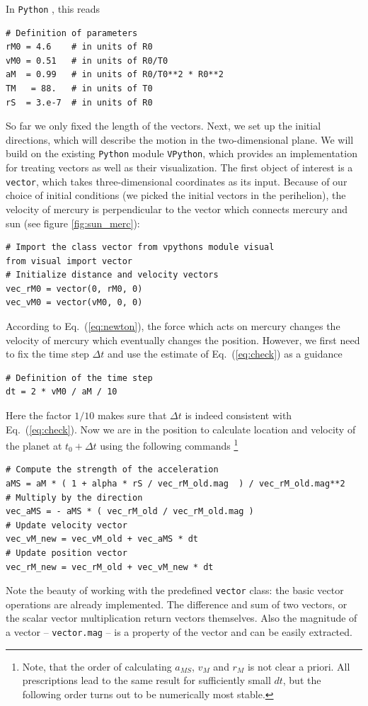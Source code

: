 \documentclass[12pt]{iopart}
\newcommand{\python}[0]{\texttt{Python} }
\begin{document}
In \python, this reads
\begin{lstlisting}
# Definition of parameters
rM0 = 4.6    # in units of R0
vM0 = 0.51   # in units of R0/T0
aM  = 0.99   # in units of R0/T0**2 * R0**2
TM   = 88.   # in units of T0
rS  = 3.e-7  # in units of R0
\end{lstlisting}
So far we only fixed the length of the vectors.
Next, we set up the initial directions, which will describe the motion in the two-dimensional plane.  We will build on the existing \python module \texttt{VPython}, which provides  an implementation for treating vectors as well as their visualization.
The first object of interest is a \texttt{vector}, which takes three-dimensional coordinates as its input.  Because of our choice of initial conditions (we picked the initial vectors in the perihelion), the velocity of mercury is perpendicular to the vector which connects mercury and sun (see figure \ref{fig:sun_merc}):
\begin{lstlisting}
# Import the class vector from vpythons module visual
from visual import vector
# Initialize distance and velocity vectors
vec_rM0 = vector(0, rM0, 0)
vec_vM0 = vector(vM0, 0, 0)
\end{lstlisting}
According to Eq.~(\ref{eq:newton}), the force which acts on mercury changes the velocity of mercury which eventually changes the position. However, we first need to fix the time step $\Delta t$ and use the estimate
of Eq.~(\ref{eq:check}) as a guidance
\begin{lstlisting}
# Definition of the time step
dt = 2 * vM0 / aM / 10
\end{lstlisting}
Here the factor $1/10$ makes sure that $\Delta t$ is indeed consistent with Eq.~(\ref{eq:check}).
Now we are in the position to calculate
location and velocity of the planet at $t_0+\Delta t$ using the following commands \footnote{Note, that the order of calculating $a_{MS}$, $v_M$ and $r_M$ is not clear a priori. All prescriptions lead to the same result for sufficiently small $dt$, but the following order turns out to be numerically most stable.}
\begin{lstlisting}
# Compute the strength of the acceleration
aMS = aM * ( 1 + alpha * rS / vec_rM_old.mag  ) / vec_rM_old.mag**2
# Multiply by the direction
vec_aMS = - aMS * ( vec_rM_old / vec_rM_old.mag )
# Update velocity vector
vec_vM_new = vec_vM_old + vec_aMS * dt
# Update position vector
vec_rM_new = vec_rM_old + vec_vM_new * dt
\end{lstlisting}
Note the beauty of working with the predefined \texttt{vector} class: the basic vector operations are already implemented.  The difference and sum of two vectors, or the scalar vector multiplication return vectors themselves.  Also the magnitude of a vector -- \texttt{vector.mag} -- is a property of the vector and can be easily extracted.
\end{document}
